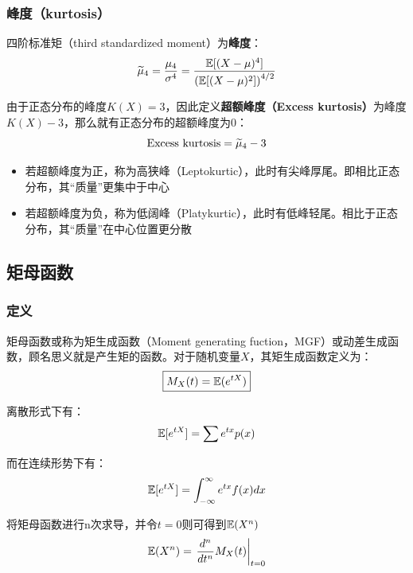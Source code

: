 \documentclass[11pt]{article}
\begin{document}
\subsubsection*{峰度（kurtosis）}
四阶标准矩（third standardized moment）为\textbf{峰度}：
\begin{equation*}
    \widetilde{\mu}_4 = \frac{\mu_4}{\sigma^4} = \frac{\mathbb{E}[(X-\mu)^4]}{\left(\mathbb{E}[(X-\mu)^2]\right)^{4/2}} 
\end{equation*}

由于正态分布的峰度$K(X)=3$，因此定义\textbf{超额峰度（Excess kurtosis）}为峰度$K(X)-3$，那么就有正态分布的超额峰度为$0$：
\begin{equation*}
    \text{Excess kurtosis} = \widetilde{\mu}_4-3
\end{equation*}
\begin{itemize}
    \item 若超额峰度为正，称为高狭峰（Leptokurtic），此时有尖峰厚尾。即相比正态分布，其“质量”更集中于中心
    \item 若超额峰度为负，称为低阔峰（Platykurtic），此时有低峰轻尾。相比于正态分布，其“质量”在中心位置更分散
\end{itemize}

\subsection{矩母函数}

\subsubsection{定义}

矩母函数或称为矩生成函数（Moment generating fuction，MGF）或动差生成函数，顾名思义就是产生矩的函数。对于随机变量$X$，其矩生成函数定义为：
\begin{equation*}
    \boxed{
        M_X(t) = \mathbb{E}(e^{tX})
    }
\end{equation*}

离散形式下有：
\begin{equation*}
    \mathbb{E}[e^{tX}] = \sum e^{tx} p(x)
\end{equation*}

而在连续形势下有：
\begin{equation*}
    \mathbb{E}[e^{tX}] = \int_{-\infty}^{\infty} e^{tx} f(x) dx
\end{equation*}

\begin{thm}
    将矩母函数进行n次求导，并令$t=0$则可得到$\mathbb{E}(X^n)$
    \begin{equation*}
        \mathbb{E}(X^n) = \left. \frac{d^n}{dt^n} M_X(t) \right\vert_{t=0}
    \end{equation*}
\end{thm}
\end{document}
